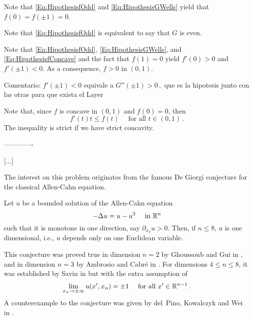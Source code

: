 Note that \eqref{Eq:HipothesisfOdd} and \eqref{Eq:HipothesisGWells} yield that $f(0)=f(\pm 1)=0$. 

Note that \eqref{Eq:HipothesisfOdd} is equivalent to say that $G$ is even.

Note that \eqref{Eq:HipothesisfOdd}, \eqref{Eq:HipothesisGWells}, and \eqref{Eq:HipothesisfConcave} and the fact that $f(1)=0$ yield $f'(0)>0$ and $f'(\pm 1) < 0$. As a consequence, $f > 0$ in $(0,1)$.

Comentario: $f'(\pm 1) < 0$ equivale a $G''(\pm 1) > 0\,,$ que es la hipotesis junto con las otras para que exista el Layer

Note that, since $f$ is concave in $(0,1)$ and $f(0)=0$, then 
\begin{equation}
\label{Eq:PropertyConcavityf}
f'(t)t \leq f(t) \quad \textrm{ for all } t\in (0,1)\,.
\end{equation}
The inequality is strict if we have strict concavity.


\bigskip
\bigskip
\bigskip
-------------
\bigskip
\bigskip
\bigskip

[...]

The interest on this problem originates from the famous De Giorgi conjecture for the classical Allen-Cahn equation.

\begin{conjecture}[De Giorgi, 1978]
	Let $u$ be a bounded solution of the Allen-Cahn equation
	\begin{equation}
	\label{Eq:LocalAllenCahn}
	-\Delta  u = u - u^3 \quad \text{ in } \mathbb{R}^n
	\end{equation}
	such that it is monotone in one direction, say $\partial_{x_n} u > 0$. Then, if $n\leq 8$, $u$ is one dimensional, i.e., $u$ depends only on one Euclidean variable.
\end{conjecture}

This conjecture was proved true in dimension $n=2$ by Ghoussoub and Gui in \cite{GhoussoubGui}, and in dimension $n=3$ by Ambrosio and Cabré in \cite{AmbrosioCabre}. For dimensions $4\leq n \leq 8$, it was established by Savin in \cite{Savin-DeGiorgi} but with the extra assumption of
\begin{equation}
\label{Eq:SavinCondition}
	\lim_{x_n \to \pm \infty} u(x',x_n) = \pm 1 \quad \text{ for all } x'\in \mathbb{R}^{n-1}\,.
\end{equation}
A counterexample to the conjecture was given by del~Pino, Kowalczyk and Wei in \cite{delPinoKowalczykWei}. 


